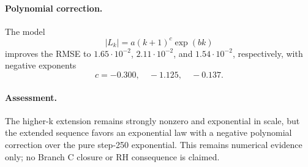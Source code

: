 \paragraph{Polynomial correction.}
The model
\[
|L_k|=a(k+1)^c\exp(bk)
\]
improves the RMSE to \(1.65\cdot10^{-2}\), \(2.11\cdot10^{-2}\), and
\(1.54\cdot10^{-2}\), respectively, with negative exponents
\[
c=-0.300,\quad -1.125,\quad -0.137.
\]

\paragraph{Assessment.}
The higher-k extension remains strongly nonzero and exponential in scale, but
the extended sequence favors an exponential law with a negative polynomial
correction over the pure step-250 exponential.  This remains numerical evidence
only; no Branch C closure or RH consequence is claimed.
